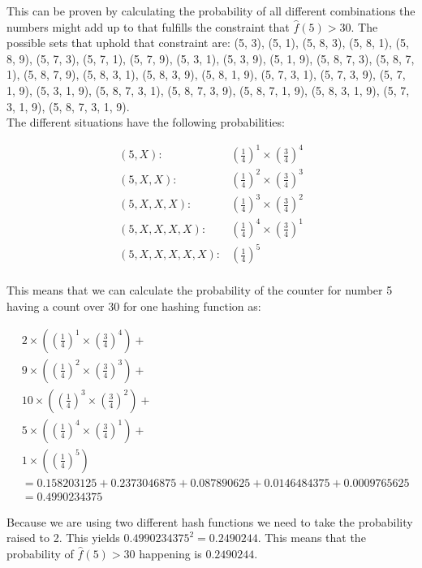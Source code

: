 \documentclass{article}
\begin{document}
\noindent This can be proven by calculating the probability of all different combinations the numbers might add up to that fulfills the constraint that  \(\hat{f}(5) > 30\). The possible sets that uphold that constraint are: (5, 3), (5, 1), (5, 8, 3), (5, 8, 1), (5, 8, 9), (5, 7, 3), (5, 7, 1), (5, 7, 9), (5, 3, 1), (5, 3, 9), (5, 1, 9), (5, 8, 7, 3), (5, 8, 7, 1), (5, 8, 7, 9), (5, 8, 3, 1), (5, 8, 3, 9), (5, 8, 1, 9), (5, 7, 3, 1), (5, 7, 3, 9), (5, 7, 1, 9), (5, 3, 1, 9), (5, 8, 7, 3, 1), (5, 8, 7, 3, 9), (5, 8, 7, 1, 9), (5, 8, 3, 1, 9), (5, 7, 3, 1, 9), (5, 8, 7, 3, 1, 9).\\ 

\noindent The different situations have the following probabilities:

\begin{align*}
(5, X):& \left(\frac{1}{4}\right)^1 \times \left(\frac{3}{4}\right)^4  \\
(5, X, X):& \left(\frac{1}{4}\right)^2 \times \left(\frac{3}{4}\right)^3 \\
(5, X, X, X):& \left(\frac{1}{4}\right)^3 \times \left(\frac{3}{4}\right)^2 \\
(5, X, X, X, X):& \left(\frac{1}{4}\right)^4 \times \left(\frac{3}{4}\right)^1 \\
(5, X, X, X, X, X):& \left(\frac{1}{4}\right)^5 \\
\end{align*}

\noindent This means that we can calculate the probability of the counter for number 5 having a count over 30 for one hashing function as:

\begin{align*}
&2 \times \left(\left(\frac{1}{4}\right)^1 \times \left(\frac{3}{4}\right)^4\right) + \\
&9 \times \left(\left(\frac{1}{4}\right)^2 \times \left(\frac{3}{4}\right)^3\right) + \\
&10 \times \left(\left(\frac{1}{4}\right)^3 \times \left(\frac{3}{4}\right)^2\right) + \\
&5 \times \left(\left(\frac{1}{4}\right)^4 \times \left(\frac{3}{4}\right)^1\right) + \\
&1 \times \left(\left(\frac{1}{4}\right)^5\right) \\
&= 0.158203125 + 0.2373046875 + 0.087890625 + 0.0146484375 + 0.0009765625  \\
&= 0.4990234375
\end{align*}


\noindent Because we are using two different hash functions we need to take the probability raised to 2. This yields \(0.4990234375^2 = 0.2490244\). This means that the probability of \(\hat{f}(5) > 30\) happening is \(0.2490244\). \\
\end{document}
